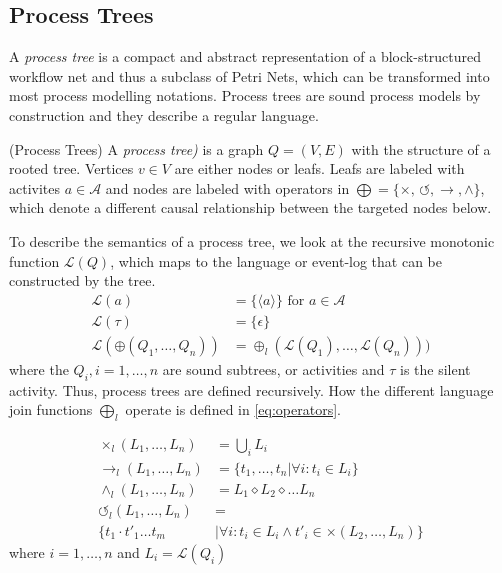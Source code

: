 \documentclass[a4paper]{IEEEtran}
\begin{document}
\subsection{Process Trees}
A \textit{process tree} is a compact and abstract representation of a block-structured workflow net and thus a subclass of Petri Nets, which can be transformed into most process modelling notations. Process trees are sound process models by construction and they describe a regular language.
\begin{defn} (Process Trees)
A \textit{process tree)} is a graph $Q = (V, E)$ with the structure of a rooted tree. Vertices $v \in V$ are either nodes or leafs. Leafs are labeled with activites $a \in \mathcal{A}$ and nodes are labeled with operators in $\bigoplus = \{ \times, \, \circlearrowleft, \rightarrow, \wedge \}$, which denote a different causal relationship between the targeted nodes below.
\end{defn}
To describe the semantics of a process tree, we look at the recursive monotonic function $\mathcal{L}(Q)$, which maps to the language or event-log that can be constructed by the tree. 
\begin{align*}
   \mathcal{L}(a) &= \{ \langle a \rangle\} \text{ for } a \in \mathcal{A} \\
   \mathcal{L}(\tau) &= \{ \epsilon \} \\
    \mathcal{L}(\oplus(Q_1, \dots, Q_n)) &= \oplus_l(\mathcal{L}(Q_1), \dots, \mathcal{L}(Q_n)))
\end{align*}
where the $Q_i, i=1, \dots, n$ are sound subtrees, or activities and $\tau$ is the silent activity. Thus, process trees are defined recursively.
How the different language join functions $\bigoplus_l$ operate is defined in \ref{eq:operators}.

\begin{align}
\label{eq:operators}
    \times_l(L_1, \dots, L_n) &= \bigcup_{i} L_i \\
    \rightarrow_l(L_1, \dots, L_n) &= \{ t_1, \dots, t_n | \forall i : t_i \in L_i\} \\
    \wedge_l(L_1, \dots, L_n) &= L_1 \diamond L_2 \diamond \dots L_n \\
    \circlearrowleft_l(L_1, \dots, L_n) &= \\
    \{ t_1 \cdot t'_1 \dots t_m &| \forall i: t_i \in L_i \wedge t'_i \in \times(L_2,\dots, L_n)\} 
\end{align}
where $i = 1, \dots, n$ and $L_i = \mathcal{L}(Q_i)$
\end{document}
